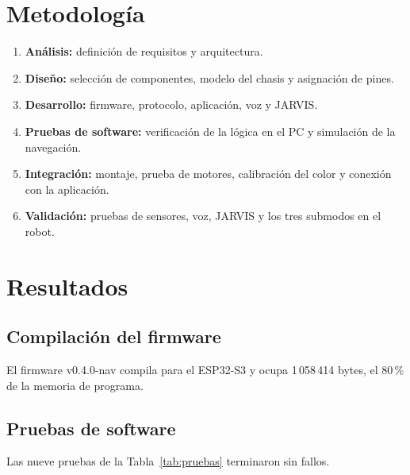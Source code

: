 \documentclass[journal]{IEEEtran}
\begin{document}
\section{Metodología}

\begin{enumerate}[1.]
    \item \textbf{Análisis:} definición de requisitos y arquitectura.
    \item \textbf{Diseño:} selección de componentes, modelo del chasis y asignación de pines.
    \item \textbf{Desarrollo:} firmware, protocolo, aplicación, voz y JARVIS.
    \item \textbf{Pruebas de software:} verificación de la lógica en el PC y simulación de la navegación.
    \item \textbf{Integración:} montaje, prueba de motores, calibración del color y conexión con la aplicación.
    \item \textbf{Validación:} pruebas de sensores, voz, JARVIS y los tres submodos en el robot.
\end{enumerate}

\section{Resultados}

\subsection{Compilación del firmware}

El firmware v0.4.0-nav compila para el ESP32-S3 y ocupa 1\,058\,414 bytes, el 80\,\% de la memoria de programa.

\subsection{Pruebas de software}

Las nueve pruebas de la Tabla~\ref{tab:pruebas} terminaron sin fallos.
\end{document}
